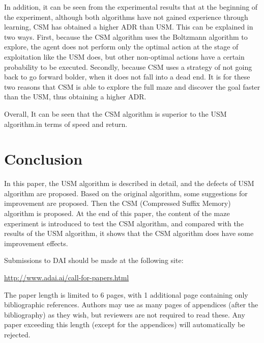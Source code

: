 \documentclass{article}
\begin{document}
In addition, it can be seen from the experimental results that at the beginning of the experiment, although both algorithms have not gained experience through learning, CSM has obtained a higher ADR than USM. This can be explained in two ways.
First, because the CSM algorithm uses the Boltzmann algorithm to explore, the agent does not perform only the optimal action at the stage of exploitation like the USM does, but other non-optimal actions have a certain probability to be executed.
Secondly, because CSM uses a strategy of not going back to go forward bolder, when it does not fall into a dead end.
It is for these two reasons that CSM is able to explore the full maze and discover the goal faster than the USM, thus obtaining a higher ADR.


Overall, It can be seen that the CSM algorithm is superior to the USM algorithm.in terms of speed and return.


\section{Conclusion}

In this paper, the USM algorithm is described in detail, and the defects of USM
algorithm are proposed. Based on the original algorithm, some suggestions for improvement
are proposed. Then the CSM (Compressed Suffix Memory) algorithm is proposed. At the end of
this paper, the content of the maze experiment is introduced to test the CSM algorithm, and
compared with the results of the USM algorithm, it shows that the CSM algorithm does have
some improvement effects.



















Submissions to DAI should be made at the following site:
	\begin{center}
	  \small
	  \url{http://www.adai.ai/call-for-papers.html}
	\end{center}
The paper length is limited to 6 pages, with 1 additional page containing only 
bibliographic references. Authors may use as many pages of appendices (after 
the bibliography) as they wish, but reviewers are not required to read these.
Any paper exceeding this length (except for the appendices) will automatically 
be rejected.
\end{document}
